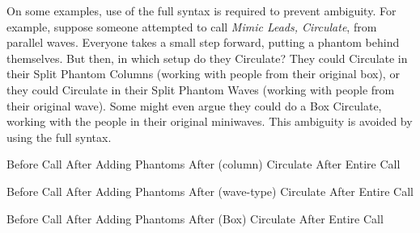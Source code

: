 \documentclass[12pt]{article}
\begin{document}
On some examples, use of the full syntax is required to
prevent ambiguity.
For example, suppose someone attempted to call
\emph{Mimic Leads, Circulate}, from parallel waves.
Everyone takes a small step forward, putting a phantom behind themselves.
But then, in which setup do they Circulate?  They could Circulate
in their Split Phantom Columns (working with people from their
original box), or they could Circulate in their Split Phantom Waves
(working with people from their original wave).  Some might even
argue they could do a Box Circulate, working with the
people in their original miniwaves.
This ambiguity is avoided by using the full syntax.

\displaytwo
{\cr
 }
{Before Call}
{\cr
 \cr
 \cr
 }
{After Adding Phantoms}
\displaytwo
{\cr
 \cr
 \cr
 }
{After (column) Circulate}
{\cr
 }
{After Entire Call}
\endexample

\displaytwo
{\cr
 }
{Before Call}
{\cr
 \cr
 \cr
 }
{After Adding Phantoms}
\displaytwo
{\cr
 \cr
 \cr
 }
{After (wave-type) Circulate}
{\cr
 }
{After Entire Call}
\endexample

\displaytwo
{\cr
 }
{Before Call}
{\cr
 \cr
 \cr
 }
{After Adding Phantoms}
\displaytwo
{\cr
 \cr
 \cr
 }
{After (Box) Circulate}
{\cr
 }
{After Entire Call}
\endexample
\end{document}
